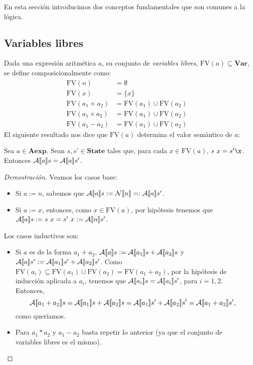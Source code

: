 En esta sección introducimos dos conceptos fundamentales que son comunes a la lógica.

\subsection{Variables libres}

Dada una expresión aritmética $a$, su conjunto de \textit{variables libres}, $\mathrm{FV}(a) \subseteq \mathbf{Var}$, se define composicionalmente como:
\begin{align*}
    \mathrm{FV}(n) & = \emptyset\\
    \mathrm{FV}(x) & = \{x\}\\
    \mathrm{FV}(a_1 + a_2) & = \mathrm{FV}(a_1) \cup \mathrm{FV}(a_2) \\
    \mathrm{FV}(a_1 \times a_2) & = \mathrm{FV}(a_1) \cup \mathrm{FV}(a_2) \\
    \mathrm{FV}(a_1 - a_2) & = \mathrm{FV}(a_1) \cup \mathrm{FV}(a_2) 
\end{align*}
El siguiente resultado nos dice que $\mathrm{FV}(a)$ determina el valor semántico de $a$:

\begin{lema}
Sea $a\in \mathbf{Aexp}$. Sean $s, s' \in \mathbf{State}$ tales que, para cada $x \in \mathrm{FV}(a)$, $s\ x = s'\x$. Entonces $\mathcal{A}[\![a]\!]s = \mathcal{A}[\![a]\!]s'$.
\end{lema}
\begin{proof}[Demostración]
Veamos los casos base:
\begin{itemize}
    \item Si $a:= n$, sabemos que $\mathcal{A}[\![a]\!]s := \mathcal{N}[\![n]\!] =: \mathcal{A}[\![a]\!]s'$.
    \item Si $a := x$, entonces, como $x \in \mathrm{FV}(a)$, por hipótesis tenemos que $\fc{A}{a}s := s\ x  = s'\ x := \fc{A}{n}s'$.
\end{itemize}
Los casos inductivos son:
\begin{itemize}
    \item Si $a$ es de la forma $a_1 + a_2$, $\mathcal{A}[\![a]\!]s := \mathcal{A}[\![a_1]\!]s + \mathcal{A}[\![a_2]\!]s$ y $\mathcal{A}[\![a]\!]s' := \mathcal{A}[\![a_1]\!]s' + \mathcal{A}[\![a_2]\!]s'$. Como $\mathrm{FV}(a_i) \subseteq \mathrm{FV}(a_1) \cup\mathrm{FV}(a_2) = \mathrm{FV}(a_1 + a_2)$, por la hipótesis de inducción aplicada a $a_i$, tenemos que $\mathcal{A}[\![a_i]\!]s = \mathcal{A}[\![a_i]\!]s'$, para $i = 1, 2$. Entonces,
$$\fc{A}{a_1+a_2}s = \fc{A}{a_1}s + \fc{A}{a_2}s = \fc{A}{a_1}s' + \fc{A}{a_2}s' = \fc{A}{a_1+a_2}s',$$
como queríamos. 
    \item Para $a_1 * a_2$ y $a_1 - a_2$ basta repetir lo anterior (ya que el conjunto de variables libres es el mismo).
\end{itemize}
\end{proof}

